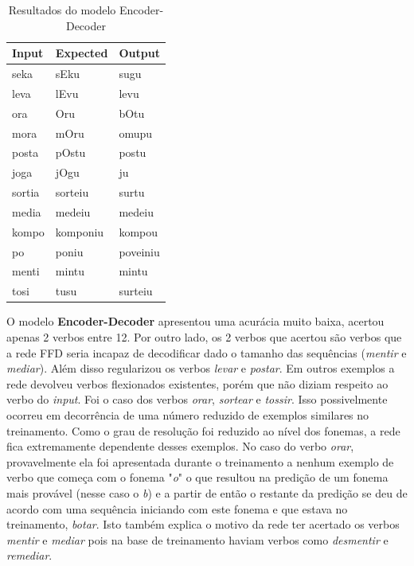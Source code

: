 \begin{table}[H]
\centering
\begin{tabular}{lll}
\textbf{Input} & \textbf{Expected} & \textbf{Output} \\ \hline
seka& sEku& sugu \\
leva& lEvu& levu \\
ora& Oru& bOtu\\
mora& mOru& omupu\\
posta& pOstu& postu\\
joga& jOgu& ju\\
sortia& sorteiu& surtu\\
media& medeiu& medeiu\\
kompo& komponiu& kompou\\
po& poniu& poveiniu\\
menti& mintu& mintu\\
tosi& tusu& surteiu\\
\end{tabular}
\caption{Resultados do modelo Encoder-Decoder}
\label{tab:res2}
\end{table}

O modelo \textbf{Encoder-Decoder} apresentou uma acurácia muito baixa, acertou apenas 2 verbos entre 12. Por outro lado, os 2 verbos que acertou são verbos que a rede FFD seria incapaz de decodificar dado o tamanho das sequências (\textit{mentir} e \textit{mediar}). Além disso regularizou os verbos \textit{levar} e \textit{postar}. Em outros exemplos a rede devolveu verbos flexionados existentes, porém que não diziam respeito ao verbo do \textit{input}. Foi o caso dos verbos \textit{orar}, \textit{sortear} e \textit{tossir}. Isso possivelmente ocorreu em decorrência de uma número reduzido de exemplos similares no treinamento. Como o grau de resolução foi reduzido ao nível dos fonemas, a rede fica extremamente dependente desses exemplos. No caso do verbo \textit{orar}, provavelmente ela foi apresentada durante o treinamento a nenhum exemplo de verbo que começa com o fonema "\textit{o}"  o que resultou na predição de um fonema mais provável (nesse caso o \textit{b}) e a partir de então o restante da predição se deu de acordo com uma sequência iniciando com este fonema e que estava no treinamento, \textit{botar}. Isto também explica o motivo da rede ter acertado os verbos \textit{mentir} e \textit{mediar} pois na base de treinamento haviam verbos como \textit{desmentir} e \textit{remediar}.


